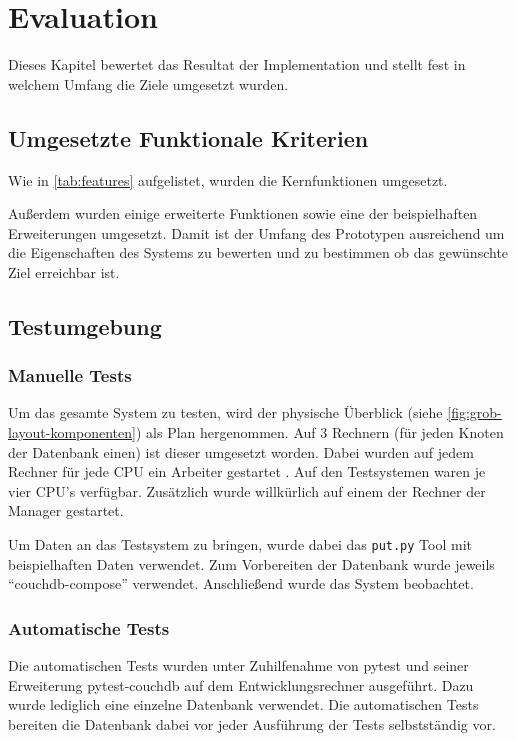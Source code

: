 \chapter{Evaluation}

Dieses Kapitel bewertet das Resultat der Implementation und
stellt fest in welchem Umfang die Ziele umgesetzt wurden.

\section{Umgesetzte Funktionale Kriterien}
Wie in \cref{tab:features} aufgelistet,
wurden die Kernfunktionen umgesetzt.

    

Außerdem wurden einige erweiterte Funktionen sowie eine der beispielhaften Erweiterungen umgesetzt.
Damit ist der Umfang des Prototypen ausreichend um die Eigenschaften des Systems zu bewerten und zu bestimmen ob das gewünschte Ziel erreichbar ist.


\section{Testumgebung}


\subsection{Manuelle Tests}
Um das gesamte System zu testen, wird der physische Überblick (siehe \cref{fig:grob-layout-komponenten}) als Plan hergenommen.
Auf 3 Rechnern (für jeden Knoten der Datenbank einen) ist dieser umgesetzt worden.
Dabei wurden auf jedem Rechner für jede CPU ein Arbeiter gestartet .
Auf den Testsystemen waren je vier CPU's verfügbar.
Zusätzlich wurde willkürlich auf einem der Rechner der Manager gestartet.

Um Daten an das Testsystem zu bringen, wurde dabei das \verb|put.py| Tool mit beispielhaften Daten verwendet.
Zum Vorbereiten der Datenbank wurde jeweils ``couchdb-compose'' \cite{couchdb:compose} verwendet.
Anschließend wurde das System beobachtet.

\subsection{Automatische Tests}
Die automatischen Tests wurden unter Zuhilfenahme von pytest \cite{pytest:website} und seiner Erweiterung  pytest-couchdb \cite{pytest:couchdbkit} auf dem Entwicklungsrechner  ausgeführt.
Dazu wurde lediglich eine einzelne Datenbank verwendet.
Die automatischen Tests bereiten die Datenbank dabei vor jeder Ausführung der Tests selbstständig vor.

